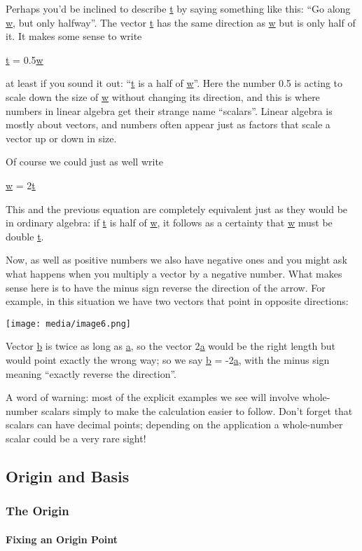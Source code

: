 \documentclass[oneside,english]{amsbook}
\numberwithin{section}{chapter}
\theoremstyle{plain}
\theoremstyle{definition}
\begin{document}
Perhaps you'd be inclined to describe \ul{t} by saying something like
this: ``Go along \ul{w}, but only halfway''. The vector \ul{t} has the
same direction as \ul{w} but is only half of it. It makes some sense to
write

\ul{t} = 0.5\ul{w}

at least if you sound it out: ``\ul{t} is a half of \ul{w}''. Here the
number 0.5 is acting to scale down the size of \ul{w} without changing
its direction, and this is where numbers in linear algebra get their
strange name ``scalars''. Linear algebra is mostly about vectors, and
numbers often appear just as factors that scale a vector up or down in
size.

Of course we could just as well write

\ul{w} = 2\ul{t}

This and the previous equation are completely equivalent just as they
would be in ordinary algebra: if \ul{t} is half of \ul{w}, it follows as
a certainty that \ul{w} must be double \ul{t}.

Now, as well as positive numbers we also have negative ones and you
might ask what happens when you multiply a vector by a negative number.
What makes sense here is to have the minus sign reverse the direction of
the arrow. For example, in this situation we have two vectors that point
in opposite directions:

\texttt{[image: media/image6.png]}

Vector \ul{b} is twice as long as \ul{a}, so the vector 2\ul{a} would be
the right length but would point exactly the wrong way; so we say \ul{b}
= -2\ul{a}, with the minus sign meaning ``exactly reverse the
direction''.

A word of warning: most of the explicit examples we see will involve
whole-number scalars simply to make the calculation easier to follow.
Don't forget that scalars can have decimal points; depending on the
application a whole-number scalar could be a very rare sight!

\subsection{Origin and Basis}

\subsubsection{The Origin}

\paragraph{Fixing an Origin Point}
\end{document}
